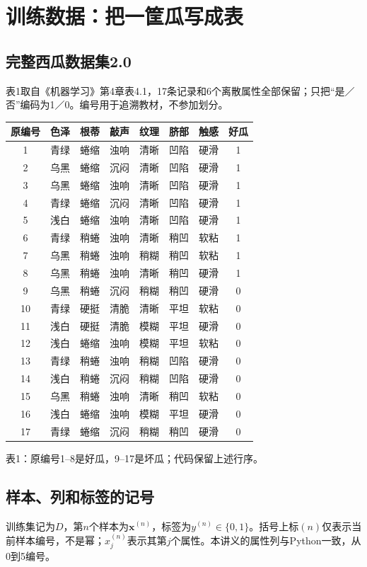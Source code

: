 \documentclass[UTF8,a4paper,11pt,fontset=fandol]{ctexart}
\numberwithin{equation}{subsection}
\begin{document}
\clearpage
\section{训练数据：把一筐瓜写成表}
\subsection{完整西瓜数据集2.0}
表1取自《机器学习》第4章表4.1，17条记录和6个离散属性全部保留；只把“是／否”编码为1／0。编号用于追溯教材，不参加划分。
\begin{center}
{\small
\begin{tabular}{cccccccc}
\toprule
原编号 & 色泽 & 根蒂 & 敲声 & 纹理 & 脐部 & 触感 & 好瓜\\
\midrule
1 & 青绿 & 蜷缩 & 浊响 & 清晰 & 凹陷 & 硬滑 & 1\\
2 & 乌黑 & 蜷缩 & 沉闷 & 清晰 & 凹陷 & 硬滑 & 1\\
3 & 乌黑 & 蜷缩 & 浊响 & 清晰 & 凹陷 & 硬滑 & 1\\
4 & 青绿 & 蜷缩 & 沉闷 & 清晰 & 凹陷 & 硬滑 & 1\\
5 & 浅白 & 蜷缩 & 浊响 & 清晰 & 凹陷 & 硬滑 & 1\\
6 & 青绿 & 稍蜷 & 浊响 & 清晰 & 稍凹 & 软粘 & 1\\
7 & 乌黑 & 稍蜷 & 浊响 & 稍糊 & 稍凹 & 软粘 & 1\\
8 & 乌黑 & 稍蜷 & 浊响 & 清晰 & 稍凹 & 硬滑 & 1\\
9 & 乌黑 & 稍蜷 & 沉闷 & 稍糊 & 稍凹 & 硬滑 & 0\\
10 & 青绿 & 硬挺 & 清脆 & 清晰 & 平坦 & 软粘 & 0\\
11 & 浅白 & 硬挺 & 清脆 & 模糊 & 平坦 & 硬滑 & 0\\
12 & 浅白 & 蜷缩 & 浊响 & 模糊 & 平坦 & 软粘 & 0\\
13 & 青绿 & 稍蜷 & 浊响 & 稍糊 & 凹陷 & 硬滑 & 0\\
14 & 浅白 & 稍蜷 & 沉闷 & 稍糊 & 凹陷 & 硬滑 & 0\\
15 & 乌黑 & 稍蜷 & 浊响 & 清晰 & 稍凹 & 软粘 & 0\\
16 & 浅白 & 蜷缩 & 浊响 & 模糊 & 平坦 & 硬滑 & 0\\
17 & 青绿 & 蜷缩 & 沉闷 & 稍糊 & 稍凹 & 硬滑 & 0\\
\bottomrule
\end{tabular}}

{\small 表1：原编号1--8是好瓜，9--17是坏瓜；代码保留上述行序。}
\end{center}

\subsection{样本、列和标签的记号}
训练集记为$D$，第$n$个样本为$\mathbf x^{(n)}$，标签为$y^{(n)}\in\{0,1\}$。括号上标$(n)$仅表示当前样本编号，不是幂；$x_j^{(n)}$表示其第$j$个属性。本讲义的属性列与Python一致，从0到5编号。
\end{document}
